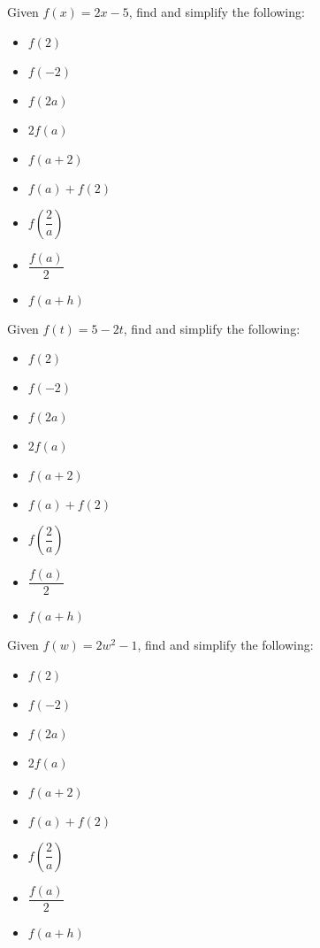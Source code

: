 \documentclass{ximera}
\begin{document}
\begin{problem}\label{secondfuncnotationbasicfirst}
Given $f(x) = 2x-5$,
find and simplify the following:

\begin{itemize}

\item  $f(2)$
\item  $f(-2)$
\item  $f(2a)$

\item  $2 f(a)$
\item $f(a+2)$
\item $f(a) + f(2)$

\item  $f \left( \dfrac{2}{a} \right)$
\item $\dfrac{f(a)}{2}$
\item  $f(a + h)$

\end{itemize}
\end{problem}

\begin{problem}
Given $f(t) = 5-2t$,
find and simplify the following:

\begin{itemize}

\item  $f(2)$
\item  $f(-2)$
\item  $f(2a)$

\item  $2 f(a)$
\item $f(a+2)$
\item $f(a) + f(2)$

\item  $f \left( \dfrac{2}{a} \right)$
\item $\dfrac{f(a)}{2}$
\item  $f(a + h)$

\end{itemize}
\end{problem}





\begin{problem}
Given $f(w) = 2w^2 - 1$,
find and simplify the following:

\begin{itemize}

\item  $f(2)$
\item  $f(-2)$
\item  $f(2a)$

\item  $2 f(a)$
\item $f(a+2)$
\item $f(a) + f(2)$

\item  $f \left( \dfrac{2}{a} \right)$
\item $\dfrac{f(a)}{2}$
\item  $f(a + h)$

\end{itemize}
\end{problem}
\end{document}

